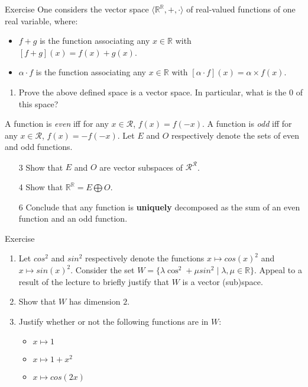 \documentclass{beamer}
\begin{document}
\begin{frame}{Exercise}
  One considers the vector space $\langle \mathbb{R}^{\mathbb{R}}, {+}, {\cdot}\rangle$ of real-valued functions of one real variable, where:
  \begin{itemize}
  \item $f+g$ is the function associating any $x \in \mathbb{R}$ with $[f+g](x) = f(x) + g(x)$.
  \item $\alpha \cdot f$ is the function associating any $x \in \mathbb{R}$ with $[\alpha \cdot f ](x) = \alpha \times f(x)$.
  \end{itemize}

  \begin{enumerate}
  \item Prove the above defined space is a vector space. In particular, what is the $0$ of this space?
  \end{enumerate}
  
  A function is \emph{even} iff for any $x \in \mathcal{R}$, $f(x) = f(-x)$. A function is \emph{odd} iff for any $x \in \mathcal{R}$, $f(x) = -f(-x)$. Let $E$ and $O$ respectively denote the sets of even and odd functions.
  \begin{enumerate}
  \item[3] Show that $E$ and $O$ are vector subspaces of $\mathcal{R}^{\mathcal{R}}$.
  \item[4] Show that $\mathbb{R}^{\mathbb{R}} = E \bigoplus O$.
  \item[6] Conclude that any function is {\textbf{uniquely}} decomposed as the sum of an even function and an odd function.
  \end{enumerate}  
\end{frame}

\begin{frame}{Exercise}
  \begin{enumerate}
  \item Let $cos^2$ and $sin^2$ respectively denote the functions $x \mapsto cos(x)^2$ and $x \mapsto sin(x)^2$. Consider the set $W = \{\lambda \cos^2 + \mu sin^2 \mid \lambda, \mu \in \mathbb{R} \}$. Appeal to a result of the lecture to briefly justify that $W$ is a vector (sub)space.
  \item Show that $W$ has dimension $2$.
  \item Justify whether or not the following functions are in $W$:
    \begin{itemize}
    \item $x \mapsto 1$
    \item $x \mapsto 1+x^2$
    \item $x \mapsto cos(2x)$
    \end{itemize}
  \end{enumerate}
\end{frame}
\end{document}
